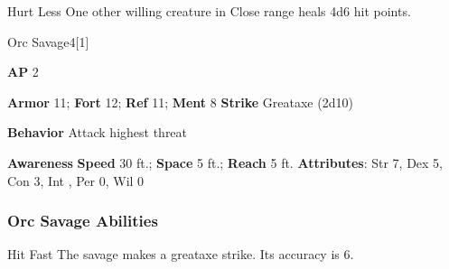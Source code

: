 \vspace{0.5em}
\begin{ability}{Hurt Less}
One other willing creature in Close range heals 4d6 hit points.
\end{ability}

\begin{monsection}{Orc Savage}{4}[1]
\vspace{-1em}\vspace{-1em}
\begin{spellcontent}
\begin{spelltargetinginfo}
{\textbf{AP} 2}

\pari \textbf{Armor} 11;
\textbf{Fort} 12;
\textbf{Ref} 11;
\textbf{Ment} 8
\pari \textbf{Strike} Greataxe  (2d10)



\pari \textbf{Behavior} Attack highest threat
\end{spelltargetinginfo}
\end{spellcontent}

\begin{monsterfooter}
\pari \textbf{Awareness} 
\pari \textbf{Speed} 30 ft.;
\textbf{Space} 5 ft.;
\textbf{Reach} 5 ft.
\pari \textbf{Attributes}:
Str 7,
Dex 5,
Con 3,
Int ,
Per 0,
Wil 0
\end{monsterfooter}
\end{monsection}


\subsubsection{Orc Savage Abilities}

\begin{ability}{Hit Fast}
The savage makes a greataxe strike.
Its accuracy is 6.
\end{ability}

